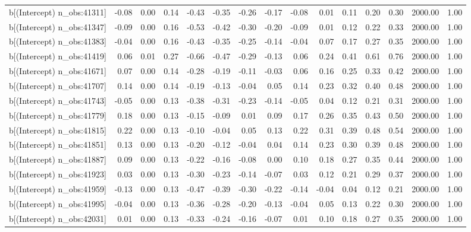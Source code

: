 \begin{table}[ht]
\begin{tabular}{rrrrrrrrrrrrrrr}
  b[(Intercept) n\_obs:41311] & -0.08 & 0.00 & 0.14 & -0.43 & -0.35 & -0.26 & -0.17 & -0.08 & 0.01 & 0.11 & 0.20 & 0.30 & 2000.00 & 1.00 \\ 
  b[(Intercept) n\_obs:41347] & -0.09 & 0.00 & 0.16 & -0.53 & -0.42 & -0.30 & -0.20 & -0.09 & 0.01 & 0.12 & 0.22 & 0.33 & 2000.00 & 1.00 \\ 
  b[(Intercept) n\_obs:41383] & -0.04 & 0.00 & 0.16 & -0.43 & -0.35 & -0.25 & -0.14 & -0.04 & 0.07 & 0.17 & 0.27 & 0.35 & 2000.00 & 1.00 \\ 
  b[(Intercept) n\_obs:41419] & 0.06 & 0.01 & 0.27 & -0.66 & -0.47 & -0.29 & -0.13 & 0.06 & 0.24 & 0.41 & 0.61 & 0.76 & 2000.00 & 1.00 \\ 
  b[(Intercept) n\_obs:41671] & 0.07 & 0.00 & 0.14 & -0.28 & -0.19 & -0.11 & -0.03 & 0.06 & 0.16 & 0.25 & 0.33 & 0.42 & 2000.00 & 1.00 \\ 
  b[(Intercept) n\_obs:41707] & 0.14 & 0.00 & 0.14 & -0.19 & -0.13 & -0.04 & 0.05 & 0.14 & 0.23 & 0.32 & 0.40 & 0.48 & 2000.00 & 1.00 \\ 
  b[(Intercept) n\_obs:41743] & -0.05 & 0.00 & 0.13 & -0.38 & -0.31 & -0.23 & -0.14 & -0.05 & 0.04 & 0.12 & 0.21 & 0.31 & 2000.00 & 1.00 \\ 
  b[(Intercept) n\_obs:41779] & 0.18 & 0.00 & 0.13 & -0.15 & -0.09 & 0.01 & 0.09 & 0.17 & 0.26 & 0.35 & 0.43 & 0.50 & 2000.00 & 1.00 \\ 
  b[(Intercept) n\_obs:41815] & 0.22 & 0.00 & 0.13 & -0.10 & -0.04 & 0.05 & 0.13 & 0.22 & 0.31 & 0.39 & 0.48 & 0.54 & 2000.00 & 1.00 \\ 
  b[(Intercept) n\_obs:41851] & 0.13 & 0.00 & 0.13 & -0.20 & -0.12 & -0.04 & 0.04 & 0.14 & 0.23 & 0.30 & 0.39 & 0.48 & 2000.00 & 1.00 \\ 
  b[(Intercept) n\_obs:41887] & 0.09 & 0.00 & 0.13 & -0.22 & -0.16 & -0.08 & 0.00 & 0.10 & 0.18 & 0.27 & 0.35 & 0.44 & 2000.00 & 1.00 \\ 
  b[(Intercept) n\_obs:41923] & 0.03 & 0.00 & 0.13 & -0.30 & -0.23 & -0.14 & -0.07 & 0.03 & 0.12 & 0.21 & 0.29 & 0.37 & 2000.00 & 1.00 \\ 
  b[(Intercept) n\_obs:41959] & -0.13 & 0.00 & 0.13 & -0.47 & -0.39 & -0.30 & -0.22 & -0.14 & -0.04 & 0.04 & 0.12 & 0.21 & 2000.00 & 1.00 \\ 
  b[(Intercept) n\_obs:41995] & -0.04 & 0.00 & 0.13 & -0.36 & -0.28 & -0.20 & -0.13 & -0.04 & 0.05 & 0.13 & 0.22 & 0.30 & 2000.00 & 1.00 \\ 
  b[(Intercept) n\_obs:42031] & 0.01 & 0.00 & 0.13 & -0.33 & -0.24 & -0.16 & -0.07 & 0.01 & 0.10 & 0.18 & 0.27 & 0.35 & 2000.00 & 1.00 \\ 

\end{tabular}
\end{table}
